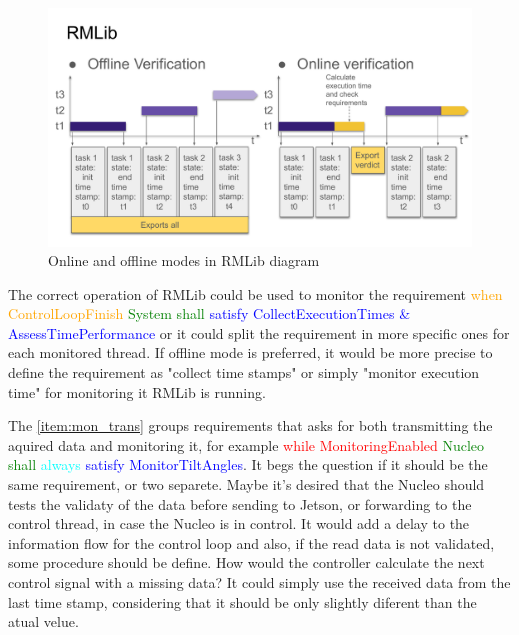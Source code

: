 \begin{figure}
	\caption{\label{fig:rmlib_on_off} Online and offline modes in \gls{RMLib} diagram}

	\begin{center}
		\includegraphics[width=\linewidth,trim=0cm 0cm 0cm 3cm,clip]{images/RMLib_online-offline_comparrison.pdf}
	\end{center}
\end{figure}

The correct operation of \gls{RMLib} could be used to monitor the requirement 
\textcolor{orange}{when ControlLoopFinish} \textcolor{green}{System shall} \textcolor{blue}{satisfy CollectExecutionTimes \& AssessTimePerformance} or it could split the requirement in more specific ones for each monitored thread. If offline mode is preferred, it would be more precise to define the requirement as "collect time stamps" or simply "monitor execution time" for monitoring it \gls{RMLib} is running.

The \autoref{item:mon_trans} groups requirements that asks for both transmitting the aquired data and monitoring it, for example \textcolor{red}{while MonitoringEnabled} \textcolor{green}{Nucleo shall} \textcolor{cyan}{always} \textcolor{blue}{satisfy MonitorTiltAngles}. It begs the question if it should be the same requirement, or two separete. Maybe it's desired that the Nucleo should tests the validaty of the data before sending to Jetson, or forwarding to the control thread, in case the Nucleo is in control. It would add a delay to the information flow for the control loop and also, if the read data is not validated, some procedure should be define. How would the controller calculate the next control signal with a missing data? It could simply use the received data from the last time stamp, considering that it should be only slightly diferent than the atual velue.

